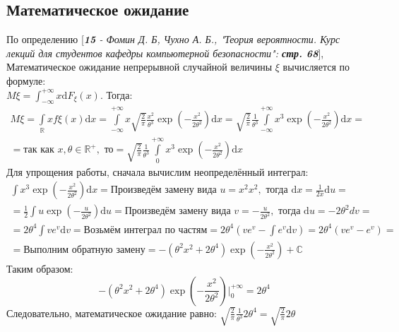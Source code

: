\documentclass[14pt,a4paper,oneside]{extbook}
\begin{document}
	\subsection{Математическое ожидание}
	По определению [\textit{\textbf{15} - Фомин Д. Б, Чухно А. Б., "Теория вероятности. Курс лекций для студентов кафедры компьютерной безопасности": \textbf{стр. 68}}], Математическое ожидание непрерывной случайной величины $\xi$ вычисляется по формуле: \\
	$M\xi = \int_{-\infty}^{+\infty}x\mathrm{d}F_{\xi}(x)$. Тогда: \\
	\begin{multline*}
    M\xi = \int\limits_\mathbb{R} x f\xi(x)\mathrm{d}x= \int\limits_{-\infty}^{+\infty}x \sqrt{\frac{2}{\pi}} \frac{x^2}{\theta^3}\exp(-\frac{x^2}{2\theta^2})\mathrm{d}x = \sqrt{\frac{2}{\pi}} \frac{1}{\theta^3} \int\limits_{-\infty}^{+\infty} x^3\exp(-\frac{x^2}{2\theta^2})\mathrm{d}x =\\=\textrm{так как }x,\theta \in \mathbb{R}^+, \textrm{ то} = \sqrt{\frac{2}{\pi}} \frac{1}{\theta^3} \int\limits_{0}^{+\infty} x^3\exp(-\frac{x^2}{2\theta^2})\mathrm{d}x \end{multline*}
    Для упрощения работы, сначала вычислим неопределённый интеграл:
    \begin{multline*}
    \int x^3\exp(-\frac{x^2}{2\theta^2})\mathrm{d}x = \textrm{Произведём замену вида } u = x^{2}x^2, \textrm{ тогда } \mathrm{d}x = \frac{1}{2x}\mathrm{d}u = \\ = \frac{1}{2} \int u\exp(-\frac{u}{2\theta^2})\mathrm{d}u = \textrm{Произведём замену вида } v = -\frac{u}{2\theta^2}, \textrm{ тогда } \mathrm{d}u = -2\theta^2 d v =\\= 2\theta^4 \int v e^v \mathrm{d}v = \textrm{Возьмём интеграл по частям} =2\theta^4 (v e^v - \int e^v \mathrm{d}v) = 2\theta^4 (v e^v -  e^v) = \\ = \textrm{Выполним обратную замену} = -(\theta^2x^2 + 2\theta^4)\exp(-\frac{x^2}{2\theta^2}) + \mathbb{C}
    \end{multline*}
    Таким образом:
    $$-(\theta^2x^2 + 2\theta^4)\exp(-\frac{x^2}{2\theta^2}) \bigg|_{0}^{+\infty}  = 2\theta^4$$
    Следовательно, математическое ожидание равно: $\displaystyle \sqrt{\frac{2}{\pi}} \frac{1}{\theta^3}  2\theta^4 = \displaystyle\sqrt{\frac{2}{\pi}} 2\theta $\\
    
\end{document}
